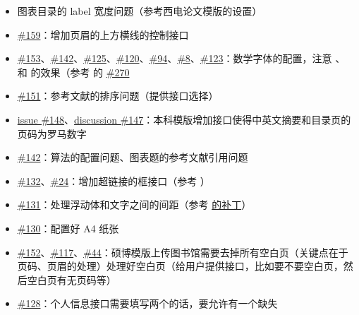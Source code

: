 \begin{itemize}
  \item 图表目录的 label 宽度问题（参考西电论文模版的设置）
  \item \href{https://github.com/whutug/whu-thesis/issues/159}{\#159}：增加页眉的上方横线的控制接口
  \item \href{https://github.com/whutug/whu-thesis/issues/153}{\#153}、\href{https://github.com/whutug/whu-thesis/issues/142}{\#142}、\href{https://github.com/whutug/whu-thesis/issues/125}{\#125}、\href{https://github.com/whutug/whu-thesis/issues/120}{\#120}、\href{https://github.com/whutug/whu-thesis/issues/94}{\#94}、\href{https://github.com/whutug/whu-thesis/issues/8}{\#8}、\href{https://github.com/whutug/whu-thesis/discussions/123}{\#123}：数学字体的配置，注意 、 和  的效果（参考  的 \href{https://github.com/stone-zeng/fduthesis/discussions/270}{\#270}
  \item \href{https://github.com/whutug/whu-thesis/issues/151}{\#151}：参考文献的排序问题（提供接口选择）
  \item \href{https://github.com/whutug/whu-thesis/issues/148}{issue \#148}、\href{https://github.com/whutug/whu-thesis/discussions/147}{discussion \#147}：本科模版增加接口使得中英文摘要和目录页的页码为罗马数字
  \item \href{https://github.com/whutug/whu-thesis/issues/142}{\#142}：算法的配置问题、图表题的参考文献引用问题
  \item \href{https://github.com/whutug/whu-thesis/issues/132}{\#132}、\href{https://github.com/whutug/whu-thesis/issues/24}{\#24}：增加超链接的框接口（参考 ）
  \item \href{https://github.com/whutug/whu-thesis/issues/131}{\#131}：处理浮动体和文字之间的间距（参考 \href{https://github.com/sikouhjw/gdutthesis/blob/c3cc2de5bfa47f7bf1b88c0884cca60119d6fd82/gdutthesis.cls#L1106-L1132}{ 的补丁}）
  \item \href{https://github.com/whutug/whu-thesis/issues/130}{\#130}：配置好 A4 纸张
  \item \href{https://github.com/whutug/whu-thesis/issues/152}{\#152}、\href{https://github.com/whutug/whu-thesis/issues/117}{\#117}、\href{https://github.com/whutug/whu-thesis/issues/44}{\#44}：硕博模版上传图书馆需要去掉所有空白页（关键点在于页码、页眉的处理）处理好空白页（给用户提供接口，比如要不要空白页，然后空白页有无页码等）
  \item \href{https://github.com/whutug/whu-thesis/issues/128}{\#128}：个人信息接口需要填写两个的话，要允许有一个缺失

\end{itemize}
